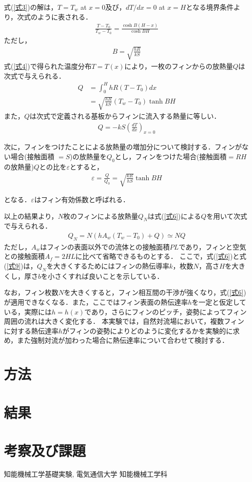 \documentclass[a4paper,11pt,uplatex]{jsarticle}
\begin{document}
式(\ref{式3})の解は，$T=T_w$ at $x=0$及び，$dT/dx=0$ at $x=H$となる境界条件より，次式のように表される．
\begin{align}
  \label{式4}
  \frac{T-T_0}{T_w-T_0}=\frac{\cosh{B(H-x)}}{\cosh{BH}}
\end{align}
ただし，
\begin{align}
  B=\sqrt{\frac{hR}{kS}}
\end{align}
式(\ref{式4})で得られた温度分布$T=T(x)$により，一枚のフィンからの放熱量$Q$は次式で与えられる．
\begin{align}
  \label{式6}
  Q &= \int^H_0 hR(T-T_0)dx \\
  &= \sqrt{\frac{hR}{kS}}(T_w-T_0)\tanh{BH}
\end{align}
また，$Q$は次式で定義される基板からフィンに流入する熱量に等しい．
\begin{align}
  Q=-kS\left(\frac{dT}{dx}\right)_{x=0}
\end{align}

\par
次に，フィンをつけたことによる放熱量の増加分について検討する．フィンがない場合(接触面積 $=S$)の放熱量を$Q_0$とし，フィンをつけた場合(接触面積$=RH$の放熱量)$Q$との比を$\varepsilon$とすると，
\begin{align}
  \varepsilon = \frac{Q}{Q_0} = \sqrt{\frac{kR}{hS}}\tanh{BH}
\end{align}

となる．$\varepsilon$はフィン有効係数と呼ばれる．
\par
以上の結果より，$N$枚のフィンによる放熱量$Q_N$は式(\ref{式6})による$Q$を用いて次式で与えられる．
\begin{align}
  \label{式9}
  Q_N = N(hA_w(T_w-T_0)+Q) \simeq NQ
\end{align}
ただし，$A_w$はフィンの表面以外での流体との接触面積$PL$であり，フィンと空気との接触面積$A_f = 2HL$に比べて省略できるものとする．
ここで，式(\ref{式6})と式(\ref{式9})は，$Q_N$を大きくするためにはフィンの熱伝導率$k$，枚数$N$，高さ$H$を大きくし，厚さ$b$を小さくすれば良いことを示している．
\par
なお，フィン枚数$N$を大きくすると，フィン相互間の干渉が強くなり，式(\ref{式6})が適用できなくなる．また，ここではフィン表面の熱伝達率$h$を一定と仮定している，実際には$h=h(x)$であり，さらにフィンのピッチ，姿勢によってフィン周囲の流れは大きく変化する．
本実験では，自然対流場において，複数フィンに対する熱伝達率$h$がフィンの姿勢によりどのように変化するかを実験的に求め，また強制対流が加わった場合に熱伝達率について合わせて検討する．

\section{方法}
\section{結果}
\section{考察及び課題}


\begin{thebibliography}{9}
   知能機械工学基礎実験, 電気通信大学  知能機械工学科
\end{thebibliography}
\end{document}
